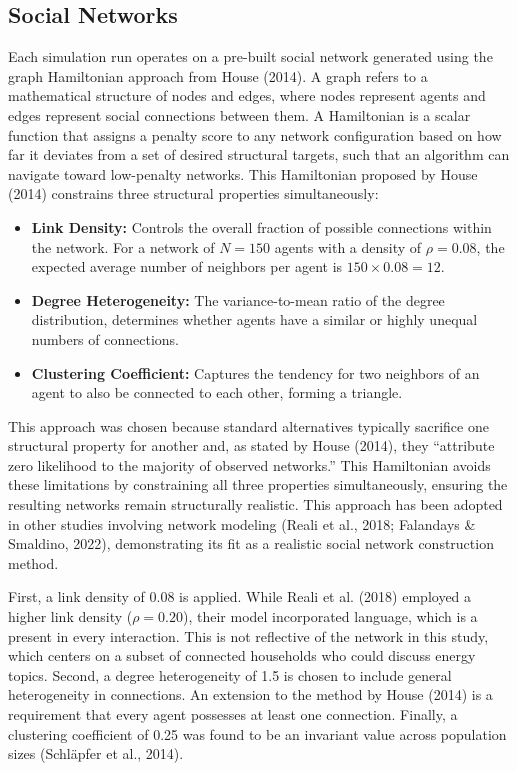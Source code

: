 \documentclass[11pt, a4paper]{article}
\begin{document}
\subsection{Social Networks} \label{subs:networks}

Each simulation run operates on a pre-built social network generated using the graph Hamiltonian approach from House (2014). A graph refers to a mathematical structure of nodes and edges, where nodes represent agents and edges represent social connections between them. A Hamiltonian is a scalar function that assigns a penalty score to any network configuration based on how far it deviates from a set of desired structural targets, such that an algorithm can navigate toward low-penalty networks. This Hamiltonian proposed by House (2014) constrains three structural properties simultaneously: 
\begin{itemize}
    \item \textbf{Link Density:} Controls the overall fraction of possible connections within the network. For a network of $N = 150$ agents with a density of $\rho = 0.08$, the expected average number of neighbors per agent is $150 \times 0.08 = 12$.
    \item \textbf{Degree Heterogeneity:} The variance-to-mean ratio of the degree distribution, determines whether agents have a similar or highly unequal numbers of connections.
    \item \textbf{Clustering Coefficient:} Captures the tendency for two neighbors of an agent to also be connected to each other, forming a triangle.
\end{itemize} 

This approach was chosen because standard alternatives typically sacrifice one structural property for another and, as stated by House (2014), they ``attribute zero likelihood to the majority of observed networks.'' This Hamiltonian avoids these limitations by constraining all three properties simultaneously, ensuring the resulting networks remain structurally realistic. This approach has been adopted in other studies involving network modeling (Reali et al., 2018; Falandays \& Smaldino, 2022), demonstrating its fit as a realistic social network construction method.

First, a link density of 0.08 is applied. While Reali et al. (2018) employed a higher link density ($\rho = 0.20$), their model incorporated language, which is a present in every interaction. This is not reflective of the network in this study, which centers on a subset of connected households who could discuss energy topics. Second, a degree heterogeneity of 1.5 is chosen to include general heterogeneity in connections. An extension to the method by House (2014) is a requirement that every agent possesses at least one connection. Finally, a clustering coefficient of 0.25 was found to be an invariant value across population sizes (Schläpfer et al., 2014).
\end{document}

